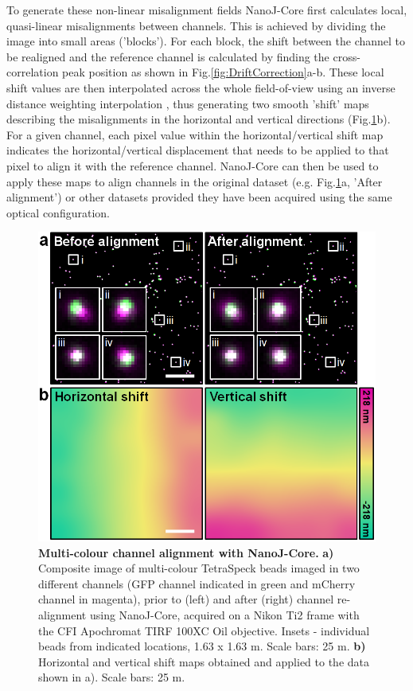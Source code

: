 To generate these non-linear misalignment fields NanoJ-Core first calculates local, quasi-linear misalignments between channels. This is achieved by dividing the image into small areas ('blocks'). For each block, the shift between the channel to be realigned and the reference channel is calculated by finding the cross-correlation peak position as shown in Fig.\ref{fig:DriftCorrection}a-b. These local shift values are then  interpolated across the whole field-of-view using an inverse distance weighting interpolation \cite{shepard1968two}, thus generating two smooth 'shift' maps describing the misalignments in the horizontal and vertical directions (Fig.\ref{fig:ChannelAlignment}b). For a given channel, each pixel value within the horizontal/vertical shift map indicates the horizontal/vertical displacement that needs to be applied to that pixel to align it with the reference channel. NanoJ-Core can then be used to apply these maps to align channels in the original dataset (e.g. Fig.\ref{fig:ChannelAlignment}a, 'After alignment') or other datasets provided they have been acquired using the same optical configuration.
 
 \begin{figure}[!t]
    \centering
    \includegraphics[width=\linewidth]{Figures/FigureChannelAlignment_v4.png}
    \caption{\textbf{Multi-colour channel alignment with NanoJ-Core.} \textbf{a)} Composite image of multi-colour TetraSpeck beads imaged in two different channels (GFP channel indicated in green and mCherry channel in magenta), prior to (left) and after (right) channel re-alignment using NanoJ-Core, acquired on a Nikon Ti2 frame with the CFI Apochromat TIRF 100XC Oil objective. Insets - individual beads from indicated locations, 1.63 x 1.63 \micro m. Scale bars: 25 \micro m. \textbf{b)} Horizontal and vertical shift maps obtained and applied to the data shown in a). Scale bars: 25 \micro m.}
    \label{fig:ChannelAlignment}
\end{figure}
 
